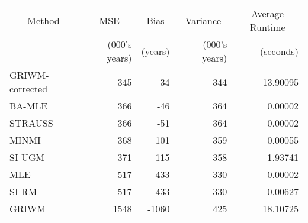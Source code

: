 
\begin{tabular}{lrrrr}
\toprule
\multicolumn{1}{c}{Method} & \multicolumn{1}{c}{MSE} & \multicolumn{1}{c}{Bias} & \multicolumn{1}{c}{Variance} & \multicolumn{1}{c}{Average Runtime} \\
\cmidrule(l{3pt}r{3pt}){1-1} \cmidrule(l{3pt}r{3pt}){2-2} \cmidrule(l{3pt}r{3pt}){3-3} \cmidrule(l{3pt}r{3pt}){4-4} \cmidrule(l{3pt}r{3pt}){5-5}
 & (000's years) & (years) & (000's years) & (seconds)\\
\midrule
GRIWM-corrected & 345 & 34 & 344 & 13.90095\\
BA-MLE & 366 & -46 & 364 & 0.00002\\
STRAUSS & 366 & -51 & 364 & 0.00002\\
MINMI & 368 & 101 & 359 & 0.00055\\
SI-UGM & 371 & 115 & 358 & 1.93741\\
\addlinespace
MLE & 517 & 433 & 330 & 0.00002\\
SI-RM & 517 & 433 & 330 & 0.00627\\
GRIWM & 1548 & -1060 & 425 & 18.10725\\
\bottomrule
\end{tabular}
